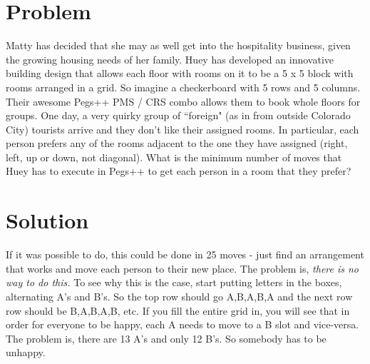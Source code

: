 \documentclass[11pt,a4paper]{report}
\theoremstyle{plain}
\theoremstyle{definition}
\theoremstyle{remark}
\begin{document}
\section*{Problem}
Matty has decided that she may as well get into the hospitality business, given the growing housing needs of her family.  Huey has developed an innovative building design that allows each floor with rooms on it to be a 5 x 5 block with rooms arranged in a grid.  So imagine a checkerboard with 5 rows and 5 columns.  Their awesome Pegs++ PMS / CRS combo allows them to book whole floors for groups.  One day, a very quirky group of ``foreign" (as in from outside Colorado City) tourists arrive and they don't like their assigned rooms.  In particular, each person prefers any of the rooms adjacent to the one they have assigned (right, left, up or down, not diagonal).  What is the minimum number of moves that Huey has to execute in Pegs++ to get each person in a room that they prefer?

\newpage
\section*{Solution}
If it was possible to do, this could be done in 25 moves - just find an arrangement that works and move each person to their new place.  The problem is, \emph{there is no way to do this.}  To see why this is the case, start putting letters in the boxes, alternating A's and B's.  So the top row should go A,B,A,B,A and the next row row should be B,A,B,A,B, etc.  If you fill the entire grid in, you will see that in order for everyone to be happy, each A needs to move to a B slot and vice-versa.  The problem is, there are 13 A's and only 12 B's.  So somebody has to be unhappy.
 
\end{document}
